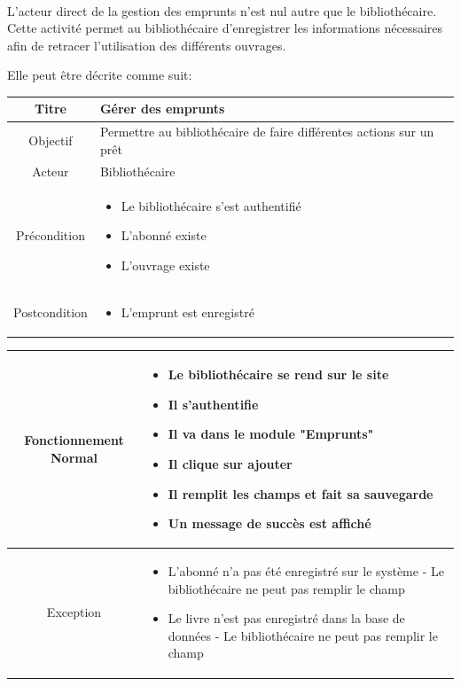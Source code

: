 \paragraph{}
L'acteur direct de la gestion des emprunts n'est nul autre que le bibliothécaire. Cette activité 
permet au bibliothécaire d'enregistrer les informations nécessaires afin de retracer l'utilisation
des différents ouvrages.\par 
Elle peut être décrite comme suit: \par 
\begin{tabular}{|c|p{7cm}|}
        \hline
        Titre & Gérer des emprunts \\
        \hline
        Objectif & Permettre au bibliothécaire de faire différentes actions sur un prêt \\
        \hline
        Acteur & Bibliothécaire \\
        \hline
        Précondition & \begin{itemize}
                \item Le bibliothécaire s'est authentifié 
                \item L'abonné existe
                \item L'ouvrage existe
        \end{itemize} \\
        \hline
        Postcondition & \begin{itemize}
                \item L'emprunt est enregistré 
        \end{itemize} \\
        \hline
\end{tabular}
\par 
\begin{tabular}{|c|p{7cm}|}
        \hline
        Fonctionnement Normal & \begin{itemize}
                \item Le bibliothécaire se rend sur le site
                \item Il s'authentifie
                \item Il va dans le module "Emprunts"
                \item Il clique sur ajouter
                \item Il remplit les champs et fait sa sauvegarde
                \item Un message de succès est affiché
        \end{itemize} \\
        \hline
        Exception & \begin{itemize}
                \item L'abonné n'a pas été enregistré sur le système - Le bibliothécaire ne peut pas remplir le champ
                \item Le livre n'est pas enregistré dans la base de données - Le bibliothécaire ne peut pas remplir le champ
        \end{itemize} \\
        \hline
\end{tabular}


